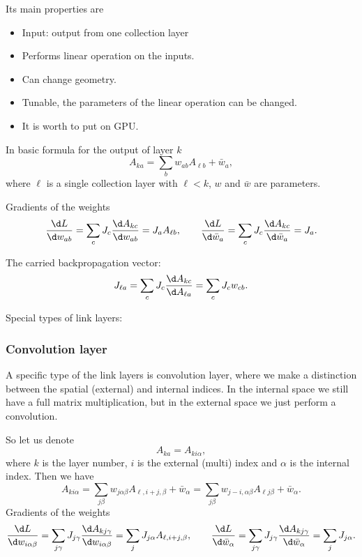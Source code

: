 \documentclass{article}
\begin{document}
Its main properties are
\begin{itemize}
\item Input: output from one collection layer
\item Performs linear operation on the inputs.
\item Can change geometry.
\item Tunable, the parameters of the linear operation can be changed.
\item It is worth to put on GPU.
\end{itemize}

In basic formula for the output of layer $k$
\begin{equation}
  A_{ka} = \sum_b w_{ab} A_{\ell b} + \bar w_{a},
\end{equation}
where $\ell$ is a single collection layer with $\ell<k$, $w$ and $\bar
w$ are parameters.

Gradients of the weights
\begin{equation}
  \frac{\d L}{\d w_{ab}} = \sum_c J_c\frac{\d A_{kc}}{\d w_{ab}} = J_a
  A_{\ell b},\qquad 
  \frac{\d L}{\d \bar w_a} = \sum_c J_c\frac{\d A_{kc}}{\d \bar w_a} = J_a.
\end{equation}

The carried backpropagation vector:
\begin{equation}
  J_{\ell a} = \sum_c J_c \frac{\d A_{kc}}{\d A_{\ell a}} = \sum_c J_c
  w_{cb}.
\end{equation}

Special types of link layers:

\subsubsection{Convolution layer}

A specific type of the link layers is convolution layer, where we make
a distinction between the spatial (external) and internal indices. In
the internal space we still have a full matrix multiplication, but in
the external space we just perform a convolution.

So let us denote
\begin{equation}
  A_{ka} = A_{ki\alpha},
\end{equation}
where $k$ is the layer number, $i$ is the external (multi) index and
$\alpha$ is the internal index. Then we have
\begin{equation}
  A_{ki\alpha} = \sum_{j\beta} w_{j\alpha\beta} A_{\ell,i+j,\beta} +
  \bar w_{\alpha} = \sum_{j\beta} w_{j-i,\alpha\beta} A_{\ell j\beta}
  + \bar w_{\alpha}.
\end{equation}
Gradients of the weights
\begin{equation}
  \frac{\d L}{\d w_{i\alpha\beta}} = \sum_{j\gamma} J_{j\gamma} \frac{\d
    A_{kj\gamma}}{\d w_{i\alpha\beta}} = \sum_{j}J_{j\alpha} A_{\ell,i+j,\beta},\qquad 
  \frac{\d L}{\d \bar w_\alpha} = \sum_{j\gamma} J_{j\gamma} \frac{\d
    A_{kj\gamma}}{\d \bar w_\alpha} = \sum_{j} J_{j\alpha}.
\end{equation}
\end{document}

